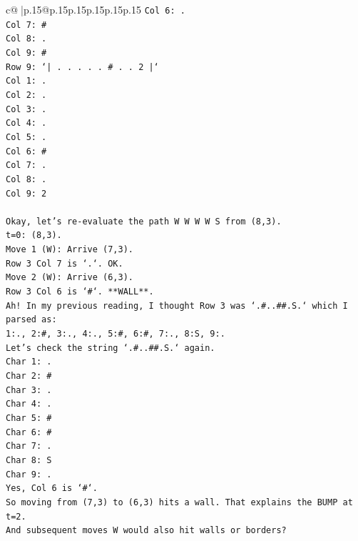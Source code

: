 \documentclass{article}
\begin{document}
{\begin{supertabular}{c@{$\;$}|p{.15\linewidth}@{}p{.15\linewidth}p{.15\linewidth}p{.15\linewidth}p{.15\linewidth}p{.15\linewidth}}
{{{\texttt{Col 6: .} \\
\texttt{Col 7: \#} \\
\texttt{Col 8: .} \\
\texttt{Col 9: \#} \\
\texttt{Row 9: `| . . . . . \# . . 2 |`} \\
\texttt{Col 1: .} \\
\texttt{Col 2: .} \\
\texttt{Col 3: .} \\
\texttt{Col 4: .} \\
\texttt{Col 5: .} \\
\texttt{Col 6: \#} \\
\texttt{Col 7: .} \\
\texttt{Col 8: .} \\
\texttt{Col 9: 2} \\
\\ 
\texttt{Okay, let's re{-}evaluate the path W W W W S from (8,3).} \\
\texttt{t=0: (8,3).} \\
\texttt{Move 1 (W): Arrive (7,3).} \\
\texttt{Row 3 Col 7 is `.`. OK.} \\
\texttt{Move 2 (W): Arrive (6,3).} \\
\texttt{Row 3 Col 6 is `\#`. **WALL**.} \\
\texttt{Ah! In my previous reading, I thought Row 3 was `.\#..\#\#.S.` which I parsed as:} \\
\texttt{1:., 2:\#, 3:., 4:., 5:\#, 6:\#, 7:., 8:S, 9:.} \\
\texttt{Let's check the string `.\#..\#\#.S.` again.} \\
\texttt{Char 1: .} \\
\texttt{Char 2: \#} \\
\texttt{Char 3: .} \\
\texttt{Char 4: .} \\
\texttt{Char 5: \#} \\
\texttt{Char 6: \#} \\
\texttt{Char 7: .} \\
\texttt{Char 8: S} \\
\texttt{Char 9: .} \\
\texttt{Yes, Col 6 is `\#`.} \\
\texttt{So moving from (7,3) to (6,3) hits a wall. That explains the BUMP at t=2.} \\
\texttt{And subsequent moves W would also hit walls or borders?} \\
}}}
\end{supertabular}}
\end{document}
